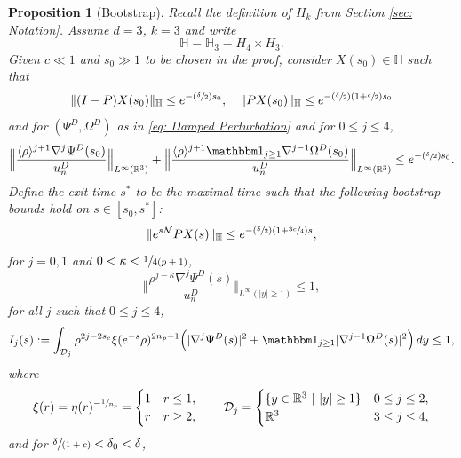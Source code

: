 \documentclass[10pt]{article}
\newcommand{\Psfrac}[2]{(\sfrac{#1}{#2})}
\newcommand{\spfrac}[2]{\sfrac{#1}{(#2)}}
\theoremstyle{plain}
\newtheorem{proposition}{Proposition}[section]
\theoremstyle{definition}
\begin{document}
\begin{proposition}[Bootstrap]
\label{prop: Bootstrap}
Recall the definition of $H_k$ from Section \ref{sec: Notation}. Assume $d=3$, $k=3$ and write
\[
\mathbb H=\mathbb H_3= H_4\times H_3.
\]
Given $c\ll 1$ and $s_0\gg1$ to be chosen in the proof, consider $X(s_0)\in \mathbb H$ such that
\begin{equation}
\label{eq: Choice of Initial Value 1}
\Vert (I-P)X(s_0)\Vert_{\mathbb H}\le e^{-\Psfrac{\delta}{2}s_0}, \quad \Vert PX(s_0)\Vert_{\mathbb H}\le e^{-\Psfrac{\delta}{2}(1+\sfrac{c}{2})s_0}
\end{equation}
and for $(\Psi^D,\Omega^D)$ as in \eqref{eq: Damped Perturbation} and for $0\le j\le 4$,
\begin{equation}
\label{eq: Choice of Initial Value 2}
\Big\Vert \frac{\langle\rho\rangle^{j+1}\nabla ^j\Psi^D(s_0)}{u_n^D}\Big\Vert_{L^\infty(\mathbb R^3)}+\Big\Vert \frac{\langle\rho\rangle^{j+1}\mathbbm 1_{j\ge1}\nabla ^{j-1}\Omega^D(s_0)}{u_n^D}\Big\Vert_{L^\infty(\mathbb R^3)}\le e^{- \Psfrac{\delta}{2}s_0}.
\end{equation}
Define the exit time $s^*$ to be the maximal time such that the following bootstrap bounds hold on $s\in [s_0,s^*]$:
\begin{equation}
\label{eq: Bootstrap Bound 1}
\Vert e^{s\mathcal N}PX(s)\Vert_{\mathbb H}\le e^{-\Psfrac{\delta}{2}(1+\sfrac{3c}{4})s},
\end{equation}
for $j=0, 1$ and $0<\kappa<\sfrac{1}{4(p+1)}$,
\begin{equation}
\label{eq: Bootstrap Bound 2}
\Big\Vert \frac{\rho^{j-\kappa}\nabla ^j\Psi^D(s)}{u_n^D}\Big\Vert_{L^\infty(|y|\ge1)}\le 1,
\end{equation}
for all $j$ such that $0\le j \le 4$,
\begin{equation}
\label{eq: Bootstrap Bound 3}
I_j(s):=\int_{\mathcal D_j} \rho^{2j-2s_c}\xi(e^{-s}\rho)^{2n_p+1}\Big(|\nabla^j\Psi^D(s)|^2+\mathbbm 1_{j\ge1}|\nabla^{j-1}\Omega^D(s)|^2\Big)\,dy\le1,
\end{equation}
where
\[
\xi(r)=\eta(r)^{-\sfrac{1}{n_p}}=\begin{cases}
1 & r\le1, \\
r & r\ge 2,
\end{cases}\qquad \mathcal D_j=\begin{cases}
\{y\in \mathbb R^3\ |\ |y|\ge1\} & 0\le j\le 2, \\
\mathbb R^3 & 3\le j\le 4,
\end{cases}
\]
and for $\spfrac{\delta}{1+c}<\delta_0<\delta$,

\end{proposition}
\end{document}
